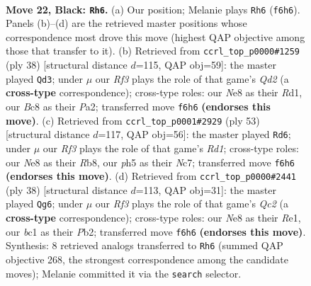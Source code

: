 \documentclass[11pt]{article}
\begin{document}
\clearpage

\begin{figure}[p]\centering
\begin{subfigure}{0.46\textwidth}\centering
\resizebox{\linewidth}{!}{%
\newchessgame
\chessboard[
  setfen={rnb1n1k1/1p4pp/1q3r2/p4p1P/PbPN1R2/6P1/6B1/RNBQ2K1 b - - 5 22},
  showmover=false,
  pgfstyle=straightmove, color=movearrow, markmove={f6-h6}
]}
\caption{}
\end{subfigure}\hfill
\begin{subfigure}{0.46\textwidth}\centering
\resizebox{\linewidth}{!}{%
\newchessgame
\chessboard[
  setfen={3q1rk1/pp4b1/3p1n2/3PppBp/2r4P/2N2P2/PP1Q2P1/1K1R3R w - - 0 20},
  showmover=false,
  pgfstyle=straightmove, color=movearrow, markmove={d2-d3}
]}
\caption{}
\end{subfigure}
\\[4pt]
\begin{subfigure}{0.46\textwidth}\centering
\resizebox{\linewidth}{!}{%
\newchessgame
\chessboard[
  setfen={1r1r2k1/1bn2p1p/p4qp1/3p4/BPpN4/P3P2P/3R1PP1/Q1R3K1 b - - 9 27},
  showmover=false,
  pgfstyle=straightmove, color=movearrow, markmove={d8-d6}
]}
\caption{}
\end{subfigure}\hfill
\begin{subfigure}{0.46\textwidth}\centering
\resizebox{\linewidth}{!}{%
\newchessgame
\chessboard[
  setfen={r4r1k/1pq1b1p1/n6p/p2pp3/P7/2P1BN1P/1PQ2PP1/R3R1K1 w - - 0 20},
  showmover=false,
  pgfstyle=straightmove, color=movearrow, markmove={c2-g6}
]}
\caption{}
\end{subfigure}
\caption{\textbf{Move 22, Black: \texttt{Rh6}.} (a) Our position; Melanie plays \texttt{Rh6} (\texttt{f6h6}). Panels (b)--(d) are the retrieved master positions whose correspondence most drove this move (highest QAP objective among those that transfer to it). (b) Retrieved from \texttt{ccrl\_top\_p0000\#1259} (ply 38) [structural distance $d$=115, QAP obj=59]: the master played \texttt{Qd3}; under $\mu$ our \emph{Rf3} plays the role of that game's \emph{Qd2} (a \textbf{cross-type} correspondence); cross-type roles: our \emph{N}e8 as their \emph{R}d1, our \emph{B}c8 as their \emph{P}a2; transferred move \texttt{f6h6} \textbf{(endorses this move)}. (c) Retrieved from \texttt{ccrl\_top\_p0001\#2929} (ply 53) [structural distance $d$=117, QAP obj=56]: the master played \texttt{Rd6}; under $\mu$ our \emph{Rf3} plays the role of that game's \emph{Rd1}; cross-type roles: our \emph{N}e8 as their \emph{R}b8, our \emph{p}h5 as their \emph{N}c7; transferred move \texttt{f6h6} \textbf{(endorses this move)}. (d) Retrieved from \texttt{ccrl\_top\_p0000\#2441} (ply 38) [structural distance $d$=113, QAP obj=31]: the master played \texttt{Qg6}; under $\mu$ our \emph{Rf3} plays the role of that game's \emph{Qc2} (a \textbf{cross-type} correspondence); cross-type roles: our \emph{N}e8 as their \emph{R}e1, our \emph{b}c1 as their \emph{P}b2; transferred move \texttt{f6h6} \textbf{(endorses this move)}. Synthesis: 8 retrieved analogs transferred to \texttt{Rh6} (summed QAP objective 268, the strongest correspondence among the candidate moves); Melanie committed it via the \texttt{search} selector.}
\label{fig:thought-m43}
\end{figure}
\end{document}

